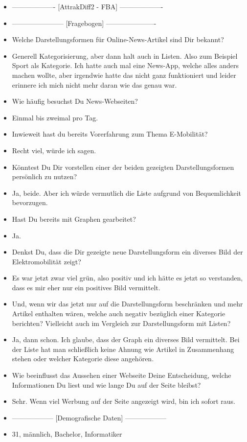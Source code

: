 {\begin{itemize}[]
        \item {-------------------} [AttrakDiff2 - FBA] {-------------------}
        \item {-----------------------} [Fragebogen] {----------------------}
        \item {} Welche Darstellungsformen für Online-News-Artikel sind Dir bekannt?
        \item {} Generell Kategorisierung, aber dann halt auch in Listen. Also zum Beispiel Sport als Kategorie.
              Ich hatte auch mal eine News-App, welche alles anders machen wollte, aber irgendwie hatte das nicht ganz funktioniert und leider erinnere ich mich nicht mehr daran wie das genau war.
        \item {} Wie häufig besuchst Du News-Webseiten?
        \item {} Einmal bis zweimal pro Tag.
        \item {} Inwieweit hast du bereits Vorerfahrung zum Thema E-Mobilität?
        \item {} Recht viel, würde ich sagen.
        \item {} Könntest Du Dir vorstellen einer der beiden gezeigten Darstellungsformen persönlich zu nutzen?
        \item {} Ja, beide. Aber ich würde vermutlich die Liste aufgrund von Bequemlichkeit bevorzugen.
        \item {} Hast Du bereits mit Graphen gearbeitet?
        \item {} Ja.
        \item {} Denkst Du, dass die Dir gezeigte neue Darstellungsform ein diverses Bild der Elektromobilität zeigt?
        \item {} Es war jetzt zwar viel grün, also positiv und ich hätte es jetzt so verstanden, dass es mir eher nur ein positives Bild vermittelt.
        \item {} Und, wenn wir das jetzt nur auf die Darstellungsform beschränken und mehr Artikel enthalten wären, welche auch negativ bezüglich einer Kategorie berichten?
              Vielleicht auch im Vergleich zur Darstellungsform mit Listen?
        \item {} Ja, dann schon. Ich glaube, dass der Graph ein diverses Bild vermittelt.
              Bei der Liste hat man schließlich keine Ahnung wie Artikel in Zusammenhang stehen oder welcher Kategorie diese angehören.
        \item {} Wie beeinflusst das Aussehen einer Webseite Deine Entscheidung, welche Informationen Du liest und wie lange Du auf der Seite bleibst?
        \item {} Sehr. Wenn viel Werbung auf der Seite angezeigt wird, bin ich sofort raus.
        \item {------------------} [Demografische Daten] {------------------}
        \item {} 31, männlich, Bachelor, Informatiker 
    \end{itemize}} 
\nolinenumbers
